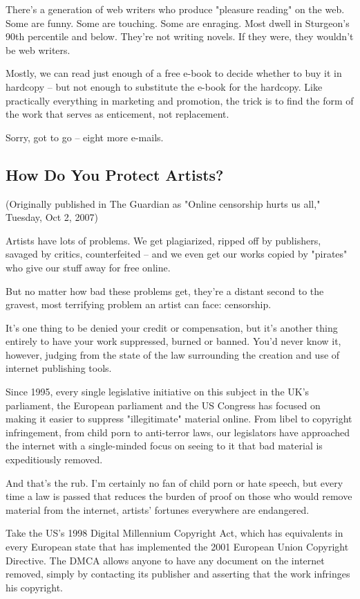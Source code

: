 There's a generation of web writers who produce "pleasure reading"
on the web. Some are funny. Some are touching. Some are enraging.
Most dwell in Sturgeon's 90th percentile and below. They're not
writing novels. If they were, they wouldn't be web writers.

Mostly, we can read just enough of a free e-book to decide whether
to buy it in hardcopy -- but not enough to substitute the e-book
for the hardcopy. Like practically everything in marketing and
promotion, the trick is to find the form of the work that serves as
enticement, not replacement.

Sorry, got to go -- eight more e-mails.

\subsection{How Do You Protect Artists?}

(Originally published in The Guardian as "Online censorship hurts
us all," Tuesday, Oct 2, 2007)

Artists have lots of problems. We get plagiarized, ripped off by
publishers, savaged by critics, counterfeited -- and we even get
our works copied by "pirates" who give our stuff away for free
online.

But no matter how bad these problems get, they're a distant second
to the gravest, most terrifying problem an artist can face:
censorship.

It's one thing to be denied your credit or compensation, but it's
another thing entirely to have your work suppressed, burned or
banned. You'd never know it, however, judging from the state of the
law surrounding the creation and use of internet publishing tools.

Since 1995, every single legislative initiative on this subject in
the UK's parliament, the European parliament and the US Congress
has focused on making it easier to suppress "illegitimate" material
online. From libel to copyright infringement, from child porn to
anti-terror laws, our legislators have approached the internet with
a single-minded focus on seeing to it that bad material is
expeditiously removed.

And that's the rub. I'm certainly no fan of child porn or hate
speech, but every time a law is passed that reduces the burden of
proof on those who would remove material from the internet,
artists' fortunes everywhere are endangered.

Take the US's 1998 Digital Millennium Copyright Act, which has
equivalents in every European state that has implemented the 2001
European Union Copyright Directive. The DMCA allows anyone to have
any document on the internet removed, simply by contacting its
publisher and asserting that the work infringes his copyright.

